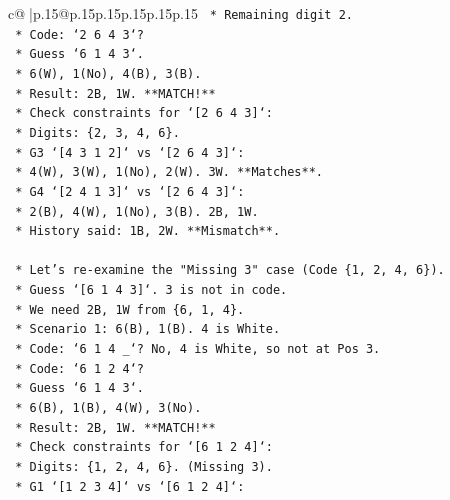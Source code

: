 \documentclass{article}
\begin{document}
{\begin{supertabular}{c@{$\;$}|p{.15\linewidth}@{}p{.15\linewidth}p{.15\linewidth}p{.15\linewidth}p{.15\linewidth}p{.15\linewidth}}
{{{\texttt{                    *   Remaining digit 2.} \\
\texttt{                    *   Code: `2 6 4 3`?} \\
\texttt{                        *   Guess `6 1 4 3`.} \\
\texttt{                        *   6(W), 1(No), 4(B), 3(B).} \\
\texttt{                        *   Result: 2B, 1W. **MATCH!**} \\
\texttt{                    *   Check constraints for `{[}2 6 4 3{]}`:} \\
\texttt{                        *   Digits: \{2, 3, 4, 6\}.} \\
\texttt{                        *   G3 `{[}4 3 1 2{]}` vs `{[}2 6 4 3{]}`:} \\
\texttt{                            *   4(W), 3(W), 1(No), 2(W). 3W. **Matches**.} \\
\texttt{                        *   G4 `{[}2 4 1 3{]}` vs `{[}2 6 4 3{]}`:} \\
\texttt{                            *   2(B), 4(W), 1(No), 3(B). 2B, 1W.} \\
\texttt{                            *   History said: 1B, 2W. **Mismatch**.} \\
\\ 
\texttt{    *   Let's re{-}examine the "Missing 3" case (Code \{1, 2, 4, 6\}).} \\
\texttt{        *   Guess `{[}6 1 4 3{]}`. 3 is not in code.} \\
\texttt{        *   We need 2B, 1W from \{6, 1, 4\}.} \\
\texttt{        *   Scenario 1: 6(B), 1(B). 4 is White.} \\
\texttt{            *   Code: `6 1 4 \_`? No, 4 is White, so not at Pos 3.} \\
\texttt{            *   Code: `6 1 2 4`?} \\
\texttt{                *   Guess `6 1 4 3`.} \\
\texttt{                *   6(B), 1(B), 4(W), 3(No).} \\
\texttt{                *   Result: 2B, 1W. **MATCH!**} \\
\texttt{            *   Check constraints for `{[}6 1 2 4{]}`:} \\
\texttt{                *   Digits: \{1, 2, 4, 6\}. (Missing 3).} \\
\texttt{                *   G1 `{[}1 2 3 4{]}` vs `{[}6 1 2 4{]}`:} \\
}}}
\end{supertabular}}
\end{document}
